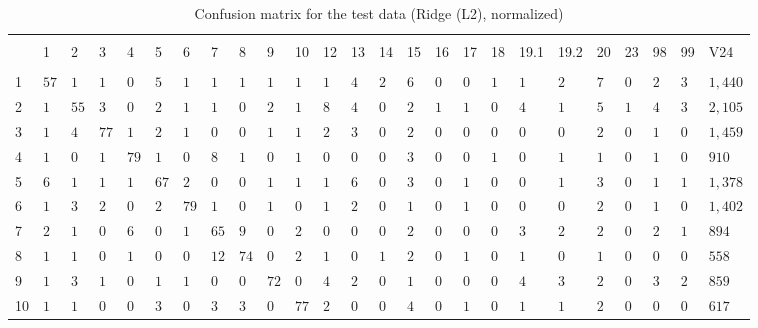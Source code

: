 
\begin{table}[!htbp] \centering 
  \caption{Confusion matrix for the test data (Ridge (L2), normalized)} 
  \label{tab:confusion-ridge} 
\begin{tabularx}{\textwidth}{XXXXXXXXXXXXXXXXXXXXXXXXX} 
\\[-1.8ex]\hline 
\hline \\[-1.8ex] 
 & 1 & 2 & 3 & 4 & 5 & 6 & 7 & 8 & 9 & 10 & 12 & 13 & 14 & 15 & 16 & 17 & 18 & 19.1 & 19.2 & 20 & 23 & 98 & 99 & V24 \\ 
\hline \\[-1.8ex] 
1 & $57$ & $1$ & $1$ & $0$ & $5$ & $1$ & $1$ & $1$ & $1$ & $1$ & $1$ & $4$ & $2$ & $6$ & $0$ & $0$ & $1$ & $1$ & $2$ & $7$ & $0$ & $2$ & $3$ & $1,440$ \\ 
2 & $1$ & $55$ & $3$ & $0$ & $2$ & $1$ & $1$ & $0$ & $2$ & $1$ & $8$ & $4$ & $0$ & $2$ & $1$ & $1$ & $0$ & $4$ & $1$ & $5$ & $1$ & $4$ & $3$ & $2,105$ \\ 
3 & $1$ & $4$ & $77$ & $1$ & $2$ & $1$ & $0$ & $0$ & $1$ & $1$ & $2$ & $3$ & $0$ & $2$ & $0$ & $0$ & $0$ & $0$ & $0$ & $2$ & $0$ & $1$ & $0$ & $1,459$ \\ 
4 & $1$ & $0$ & $1$ & $79$ & $1$ & $0$ & $8$ & $1$ & $0$ & $1$ & $0$ & $0$ & $0$ & $3$ & $0$ & $0$ & $1$ & $0$ & $1$ & $1$ & $0$ & $1$ & $0$ & $910$ \\ 
5 & $6$ & $1$ & $1$ & $1$ & $67$ & $2$ & $0$ & $0$ & $1$ & $1$ & $1$ & $6$ & $0$ & $3$ & $0$ & $1$ & $0$ & $0$ & $1$ & $3$ & $0$ & $1$ & $1$ & $1,378$ \\ 
6 & $1$ & $3$ & $2$ & $0$ & $2$ & $79$ & $1$ & $0$ & $1$ & $0$ & $1$ & $2$ & $0$ & $1$ & $0$ & $1$ & $0$ & $0$ & $0$ & $2$ & $0$ & $1$ & $0$ & $1,402$ \\ 
7 & $2$ & $1$ & $0$ & $6$ & $0$ & $1$ & $65$ & $9$ & $0$ & $2$ & $0$ & $0$ & $0$ & $2$ & $0$ & $0$ & $0$ & $3$ & $2$ & $2$ & $0$ & $2$ & $1$ & $894$ \\ 
8 & $1$ & $1$ & $0$ & $1$ & $0$ & $0$ & $12$ & $74$ & $0$ & $2$ & $1$ & $0$ & $1$ & $2$ & $0$ & $1$ & $0$ & $1$ & $0$ & $1$ & $0$ & $0$ & $0$ & $558$ \\ 
9 & $1$ & $3$ & $1$ & $0$ & $1$ & $1$ & $0$ & $0$ & $72$ & $0$ & $4$ & $2$ & $0$ & $1$ & $0$ & $0$ & $0$ & $4$ & $3$ & $2$ & $0$ & $3$ & $2$ & $859$ \\ 
10 & $1$ & $1$ & $0$ & $0$ & $3$ & $0$ & $3$ & $3$ & $0$ & $77$ & $2$ & $0$ & $0$ & $4$ & $0$ & $1$ & $0$ & $1$ & $1$ & $2$ & $0$ & $0$ & $0$ & $617$ \\ 

\end{tabularx}
\end{table}

